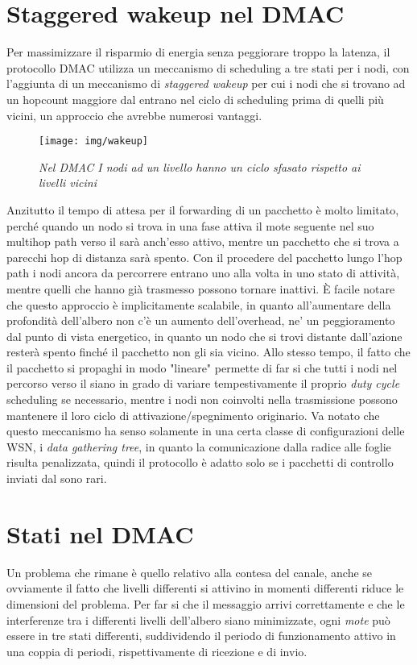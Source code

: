 \documentclass[twoside,11pt,a4paper,italian,openany]{book}
\begin{document}
\section{Staggered wakeup nel DMAC}
Per massimizzare il risparmio di energia senza peggiorare troppo la latenza, 
il protocollo DMAC utilizza un meccanismo di scheduling a tre stati per i nodi, 
con l'aggiunta di un meccanismo di \emph{staggered wakeup} per cui i nodi che si trovano ad un 
hopcount maggiore dal \sink entrano nel ciclo di scheduling prima di quelli più vicini, un 
approccio che avrebbe numerosi vantaggi.
\begin{figure}
\texttt{[image: img/wakeup]}
\caption{\emph{Nel DMAC I nodi ad un livello hanno un ciclo sfasato rispetto ai livelli vicini}}
\end{figure} 
 Anzitutto il tempo di attesa per il forwarding di un
pacchetto è molto limitato, perché quando un nodo si trova in una fase attiva il mote seguente
nel suo multihop path verso il \sink sarà anch'esso attivo, mentre un pacchetto che si trova 
a parecchi hop di distanza sarà spento. 
Con il procedere del pacchetto lungo l'hop path i nodi ancora da percorrere entrano uno alla 
volta in uno stato di attività, mentre quelli che hanno già trasmesso possono tornare inattivi.
\`E facile notare che questo approccio è implicitamente scalabile, in quanto all'aumentare della profondità dell'albero non c'è un aumento dell'overhead, ne' un peggioramento dal punto di vista energetico, in quanto un nodo che si trovi distante dall'azione resterà spento finché il 
pacchetto non gli sia vicino.
Allo stesso tempo, il fatto che il pacchetto si propaghi in modo "lineare" permette di far si 
che tutti i nodi nel percorso verso il \sink  siano in grado di variare tempestivamente il 
proprio \emph{duty cycle} scheduling se necessario, mentre i nodi non coinvolti nella trasmissione possono mantenere il loro ciclo di attivazione/spegnimento originario. 
Va notato che questo meccanismo ha senso solamente in una certa classe di configurazioni 
delle WSN, i \emph{data gathering tree}, in quanto la comunicazione dalla radice alle foglie 
risulta penalizzata, quindi il protocollo è adatto solo se i pacchetti di controllo 
inviati dal \sink sono rari. 

\section{Stati nel DMAC}
Un problema che rimane è quello relativo alla contesa del canale, anche se ovviamente il fatto 
che livelli differenti si attivino in momenti differenti riduce le dimensioni del problema.
Per far si che il messaggio arrivi correttamente e che le interferenze tra i differenti livelli 
dell'albero siano minimizzate, ogni \emph{mote} può essere in tre stati differenti, 
suddividendo il  periodo di funzionamento attivo in una coppia di periodi,
rispettivamente di ricezione e di invio.
\end{document}
